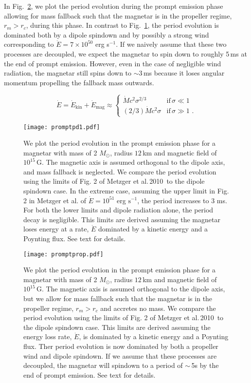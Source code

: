 \documentclass{article}
\begin{document}
In Fig.~\ref{fig:pprop}, we plot the period evolution during the prompt emission phase allowing for mass fallback such that the magnetar is in the propeller regime, $r_m > r_c$, during this phase. In contrast to Fig.~\ref{fig:7}, the period evolution is dominated both by a dipole spindown and by possibly a strong wind corresponding to $\dot{E} = 7 \times 10^{50}$ erg s$^{-1}$. If we naively assume that these two processes are decoupled, we expect the magnetar to spin down to roughly 5\,ms at the end of prompt emission. However, even in the case of negligible wind radiation, the magnetar still spins down to $\sim 3$\,ms because it loses angular momentum propelling the fallback mass outwards.

\begin{equation}\label{eq:edot}
\dot{E} =\dot{E}_\mathrm{kin}+\dot{E}_\mathrm{mag} \approx
\begin{cases}
\dot{M} c^2 \sigma^{2/3}& \text{if}\, \sigma \ll 1 \\
(2/3) \dot{M} c^2 \sigma & \text{if}\, \sigma \gg 1\,\,.
\end{cases}
\end{equation}

\begin{figure}[h!]
\centering
\texttt{[image: promptpd1.pdf]}
\caption{We plot the period evolution in the prompt emission phase for a magnetar with mass of 2 $M_{\odot}$, radius $12$\,km and magnetic field of $10^{15}$\,G. The magnetic axis is assumed orthogonal to the dipole axis, and mass fallback is neglected. We compare the period evolution using the limits of Fig. 2 of Metzger et al.\,2010\,\cite{Metzger:2010pp} to the dipole spindown case. In the extreme case, assuming the upper limit in Fig. 2 in Metzger et al. of $\dot{E}=10^{51}$ erg $\mathrm{s}^{-1}$, the period increases to 3 ms. For both the lower limits and dipole radiation alone, the period decay is negligible. This limits are derived assuming the magnetar loses energy at a rate, $\dot{E}$ dominated by a kinetic energy and a Poynting flux. See text for details.}
\label{fig:7}
\end{figure}

\begin{figure}[h!]
\centering
\texttt{[image: promptprop.pdf]}
\caption{We plot the period evolution in the prompt emission phase for a magnetar with mass of 2 $M_{\odot}$, radius $12$\,km and magnetic field of $10^{15}$\,G. The magnetic axis is assumed orthogonal to the dipole axis, but we allow for mass fallback such that the magnetar is in the propeller regime, $r_m > r_c$ and accretes no mass. We compare the period evolution using the limits of Fig. 2 of Metzger et al.\,2010\,\cite{Metzger:2010pp} to the dipole spindown case. This limits are derived assuming the energy loss rate, $\dot{E}$, is dominated by a kinetic energy and a Poynting flux. Ther period evolution is now dominated by both a propeller wind and dipole spindown. If we assume that these processes are decoupled, the magnetar will spindown to a period of $\sim$\,5s by the end of prompt emission. See text for details.}
\label{fig:pprop}
\end{figure}
\end{document}
